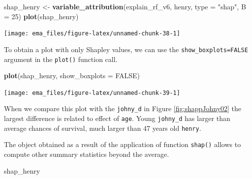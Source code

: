 \documentclass[]{krantz}
\newenvironment{Shaded}{\begin{snugshade}}{\end{snugshade}}
\newcommand{\DataTypeTok}[1]{\textcolor[rgb]{0.13,0.29,0.53}{#1}}
\newcommand{\DecValTok}[1]{\textcolor[rgb]{0.00,0.00,0.81}{#1}}
\newcommand{\KeywordTok}[1]{\textcolor[rgb]{0.13,0.29,0.53}{\textbf{#1}}}
\newcommand{\NormalTok}[1]{#1}
\newcommand{\OtherTok}[1]{\textcolor[rgb]{0.56,0.35,0.01}{#1}}
\newcommand{\StringTok}[1]{\textcolor[rgb]{0.31,0.60,0.02}{#1}}
\begin{document}
\begin{Shaded}
\begin{Highlighting}[]
\NormalTok{shap_henry <-}\StringTok{ }\KeywordTok{variable_attribution}\NormalTok{(explain_rf_v6, }
\NormalTok{                                   henry, }
                                   \DataTypeTok{type =} \StringTok{"shap"}\NormalTok{,}
                                   \DataTypeTok{B =} \DecValTok{25}\NormalTok{)}
\KeywordTok{plot}\NormalTok{(shap_henry) }
\end{Highlighting}
\end{Shaded}

\begin{center}\texttt{[image: ema\_files/figure-latex/unnamed-chunk-38-1]} \end{center}

To obtain a plot with only Shapley values, we can use the \texttt{show\_boxplots=FALSE} argument in the \texttt{plot()} function call.

\begin{Shaded}
\begin{Highlighting}[]
\KeywordTok{plot}\NormalTok{(shap_henry, }\DataTypeTok{show_boxplots =} \OtherTok{FALSE}\NormalTok{) }
\end{Highlighting}
\end{Shaded}

\begin{center}\texttt{[image: ema\_files/figure-latex/unnamed-chunk-39-1]} \end{center}

When we compare this plot with the \texttt{johny\_d} in Figure \ref{fig:shappJohny02} the largest difference is related to effect of \texttt{age}. Young \texttt{johny\_d} has larger than average chances of survival, much larger than 47 years old \texttt{henry}.

The object obtained as a result of the application of function \texttt{shap()} allows to compute other summary statistics beyond the average.

\begin{Shaded}
\begin{Highlighting}[]
\NormalTok{shap_henry}
\end{Highlighting}
\end{Shaded}
\end{document}
